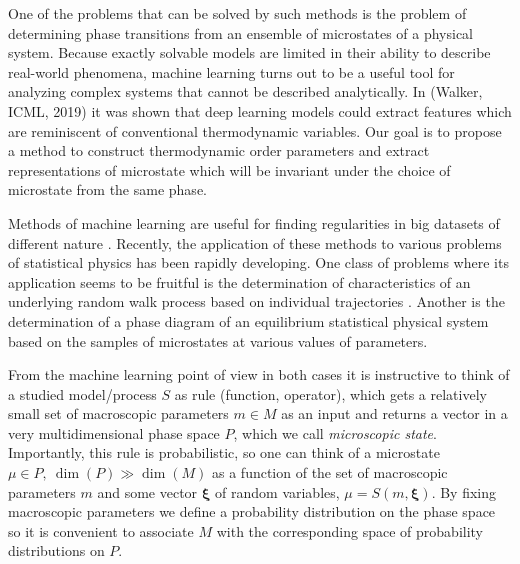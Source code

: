 \documentclass[aps,a4paper,twocolumn,showpacs]{revtex4}
\begin{document}
One of the problems that can be solved by such methods is the problem of determining phase transitions from an ensemble of microstates of a physical system. Because exactly solvable models are limited in their ability to describe real-world phenomena, machine learning turns out to be a useful tool for analyzing complex systems that cannot be described analytically.
In (Walker, ICML, 2019) it was shown that deep learning models could extract features which are reminiscent of conventional thermodynamic variables. 
Our goal is to propose a method to construct thermodynamic order parameters and extract representations of microstate which will be invariant under the choice of microstate from the same phase.

Methods of machine learning are useful for finding regularities in big datasets of different nature \cite{???}. Recently, the application of these methods to various problems of statistical physics has been rapidly developing. One class of problems where its application seems to be fruitful is the determination of characteristics of an underlying random walk process based on individual trajectories \cite{...}. Another is the determination of a phase diagram of an equilibrium statistical physical system based on the samples of microstates at various values of parameters\cite{?}. 

From the machine learning point of view in both cases it is instructive to think of a studied model/process $S$ as rule (function, operator), which gets a relatively small set of macroscopic parameters $m \in M$ as an input and returns a vector in a very multidimensional phase space $P$, which we call \emph {microscopic state}. Importantly, this rule is probabilistic, so one can think of a microstate $\mu \in P,\ \dim(P) \gg \dim (M)$ as a function of the set of macroscopic parameters $m$ and some vector $\boldsymbol{\xi}$ of random variables, $\mu = S(m,\boldsymbol{\xi})$. By fixing macroscopic parameters we define a probability distribution on the phase space so it is convenient to associate $M$ with the corresponding space of probability distributions on $P$.
\end{document}
